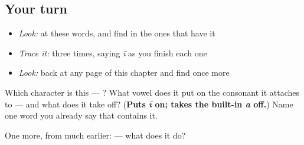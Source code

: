 \subsection*{Your turn}
\begin{itemize}
\raggedright
  \item \emph{Look:} at these words, and find  in the ones that have it
\end{itemize}

\begin{quote}
\end{quote}

\begin{itemize}
\raggedright
  \item \emph{Trace it:}  three times, saying \emph{ī} as you finish each one
  \item \emph{Look:} back at any page of this chapter and find  once more
\end{itemize}

\begin{tcolorbox}[breakable,colback=teal!4,colframe=teal!35!black,title={Before you move on}]
Which character is this — ? What vowel does it put on the consonant it attaches to — and what does it take off? (\textbf{Puts \emph{ī} on; takes the built-in \emph{a} off.}) Name one word you already say that contains it.

One more, from much earlier:  — what does it do?
\end{tcolorbox}
